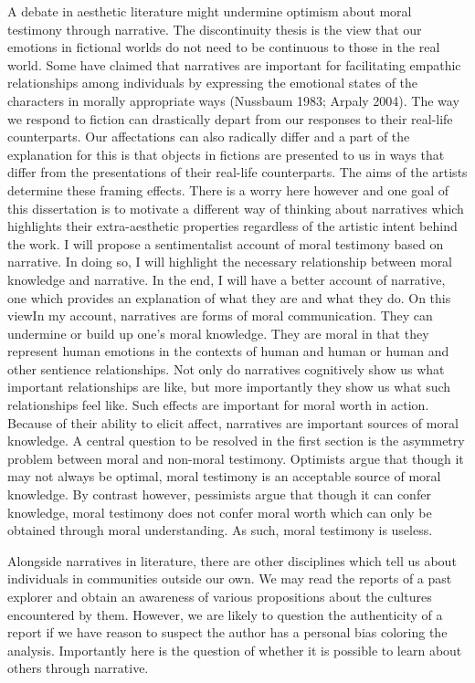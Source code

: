 \documentclass[
  letterpaper,
  DIV=11,
  numbers=noendperiod]{scrartcl}
\theoremstyle{remark}
\begin{document}
A debate in aesthetic literature might undermine optimism about moral
testimony through narrative. The discontinuity thesis is the view that
our emotions in fictional worlds do not need to be continuous to those
in the real world. Some have claimed that narratives are important for
facilitating empathic relationships among individuals by expressing the
emotional states of the characters in morally appropriate ways (Nussbaum
1983; Arpaly 2004). The way we respond to fiction can drastically depart
from our responses to their real-life counterparts. Our affectations can
also radically differ and a part of the explanation for this is that
objects in fictions are presented to us in ways that differ from the
presentations of their real-life counterparts. The aims of the artists
determine these framing effects. There is a worry here however and one
goal of this dissertation is to motivate a different way of thinking
about narratives which highlights their extra-aesthetic properties
regardless of the artistic intent behind the work. I will propose a
sentimentalist account of moral testimony based on narrative. In doing
so, I will highlight the necessary relationship between moral knowledge
and narrative. In the end, I will have a better account of narrative,
one which provides an explanation of what they are and what they do. On
this viewIn my account, narratives are forms of moral communication.
They can undermine or build up one's moral knowledge. They are moral in
that they represent human emotions in the contexts of human and human or
human and other sentience relationships. Not only do narratives
cognitively show us what important relationships are like, but more
importantly they show us what such relationships feel like. Such effects
are important for moral worth in action. Because of their ability to
elicit affect, narratives are important sources of moral knowledge. A
central question to be resolved in the first section is the asymmetry
problem between moral and non-moral testimony. Optimists argue that
though it may not always be optimal, moral testimony is an acceptable
source of moral knowledge. By contrast however, pessimists argue that
though it can confer knowledge, moral testimony does not confer moral
worth which can only be obtained through moral understanding. As such,
moral testimony is useless.

Alongside narratives in literature, there are other disciplines which
tell us about individuals in communities outside our own. We may read
the reports of a past explorer and obtain an awareness of various
propositions about the cultures encountered by them. However, we are
likely to question the authenticity of a report if we have reason to
suspect the author has a personal bias coloring the analysis.
Importantly here is the question of whether it is possible to learn
about others through narrative.
\end{document}
